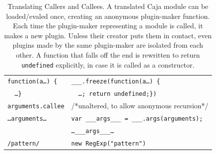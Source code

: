 \documentclass[letterpaper,twocolumn,10pt]{article}
\newcommand{\code}[1]{{\tt {#1}}}              %
\begin{document}
\begin{table}
\begin{tabular}{ll}
  \code{function(a\ldots)\ \{}
                 & \code{\_\_\_.freeze(function(a\ldots)\ \{} \\
  \code{\ \ \ldots\}}          
                 & \code{\ \ \ldots; return undefined;\})} \\
  \hline
  \code{arguments.callee}   & /*unaltered, to allow anonymous recursion*/ \\
  \code{\ldots arguments\ldots} 
     &\code{var \_\_\_args\_\_\_ = \_\_\_.args(arguments);}\\
                 & \code{\ldots \_\_\_args\_\_\_\ldots} \\
  \hline
  \code{/pattern/} & \code{new RegExp("pattern")}
\end{tabular}

\caption[Translating Callers and Callees]{Translating Callers and Callees.
A translated Caja module can be loaded/evaled once, creating an anonymous
plugin-maker function. Each time the plugin-maker representing a module is
called, it makes a new plugin. Unless their creator puts them in contact, even
plugins made by the same plugin-maker are isolated from each other. A function
that falls off the end is rewritten to return \code{undefined} explicitly, in
case it is called as a constructor.}
\label{tab:call-xlate}
\end{table}
\end{document}
